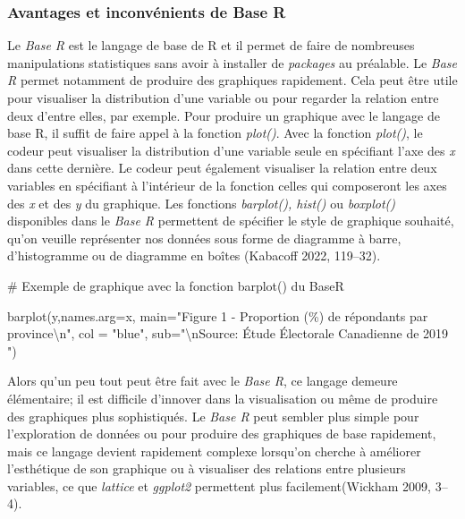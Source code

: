 \documentclass[
  letterpaper,
]{scrbook}
\newenvironment{Shaded}{\begin{snugshade}}{\end{snugshade}}
\newcommand{\AttributeTok}[1]{\textcolor[rgb]{0.40,0.45,0.13}{#1}}
\newcommand{\CommentTok}[1]{\textcolor[rgb]{0.37,0.37,0.37}{#1}}
\newcommand{\FunctionTok}[1]{\textcolor[rgb]{0.28,0.35,0.67}{#1}}
\newcommand{\NormalTok}[1]{\textcolor[rgb]{0.00,0.23,0.31}{#1}}
\newcommand{\SpecialCharTok}[1]{\textcolor[rgb]{0.37,0.37,0.37}{#1}}
\newcommand{\StringTok}[1]{\textcolor[rgb]{0.13,0.47,0.30}{#1}}
\begin{document}
\hypertarget{avantages-et-inconvuxe9nients-de-base-r}{%
\subsubsection{Avantages et inconvénients de Base
R}\label{avantages-et-inconvuxe9nients-de-base-r}}

Le \emph{Base R} est le langage de base de R et il permet de faire de
nombreuses manipulations statistiques sans avoir à installer de
\emph{packages} au préalable. Le \emph{Base R} permet notamment de
produire des graphiques rapidement. Cela peut être utile pour visualiser
la distribution d'une variable ou pour regarder la relation entre deux
d'entre elles, par exemple. Pour produire un graphique avec le langage
de base R, il suffit de faire appel à la fonction \emph{plot()}. Avec la
fonction \emph{plot()}, le codeur peut visualiser la distribution d'une
variable seule en spécifiant l'axe des \emph{x} dans cette dernière. Le
codeur peut également visualiser la relation entre deux variables en
spécifiant à l'intérieur de la fonction celles qui composeront les axes
des \emph{x} et des \emph{y} du graphique. Les fonctions
\emph{barplot(), hist()} ou \emph{boxplot()} disponibles dans le
\emph{Base R} permettent de spécifier le style de graphique souhaité,
qu'on veuille représenter nos données sous forme de diagramme à barre,
d'histogramme ou de diagramme en boîtes (Kabacoff 2022, 119--32).

\begin{Shaded}
\begin{Highlighting}[]
\CommentTok{\# Exemple de graphique avec la fonction barplot() du BaseR}

\FunctionTok{barplot}\NormalTok{(y,}\AttributeTok{names.arg=}\NormalTok{x,}
 \AttributeTok{main=}\StringTok{"Figure 1 {-} Proportion (\%) de répondants par province}\SpecialCharTok{\textbackslash{}n}\StringTok{"}\NormalTok{,}
 \AttributeTok{col =} \StringTok{"blue"}\NormalTok{,}
 \AttributeTok{sub=}\StringTok{"}\SpecialCharTok{\textbackslash{}n}\StringTok{Source: Étude Électorale Canadienne de 2019                                                "}\NormalTok{) }
\end{Highlighting}
\end{Shaded}

Alors qu'un peu tout peut être fait avec le \emph{Base R}, ce langage
demeure élémentaire; il est difficile d'innover dans la visualisation ou
même de produire des graphiques plus sophistiqués. Le \emph{Base R} peut
sembler plus simple pour l'exploration de données ou pour produire des
graphiques de base rapidement, mais ce langage devient rapidement
complexe lorsqu'on cherche à améliorer l'esthétique de son graphique ou
à visualiser des relations entre plusieurs variables, ce que
\emph{lattice} et \emph{ggplot2} permettent plus facilement(Wickham
2009, 3--4).
\end{document}

